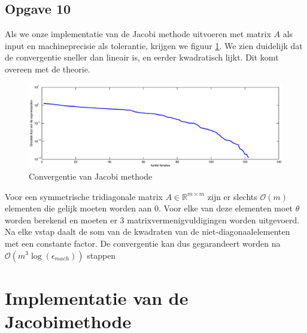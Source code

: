 \documentclass[a4paper, 12pt, titlepage]{report}
\begin{document}
\subsection{Opgave 10}
Als we onze implementatie van de Jacobi methode uitvoeren met matrix $A$ als input en machineprecisie als tolerantie, krijgen we figuur \ref{jacobigraph}. We zien duidelijk dat de convergentie sneller dan lineair is, en eerder kwadratisch lijkt. Dit komt overeen met de theorie. \\
\begin{figure}[htb]
	\begin{center}
	 \includegraphics[width=\textwidth]{jacobi.eps}
	\caption{Convergentie van Jacobi methode}
	\label{jacobigraph}
	\end{center}
\end{figure}

Voor een symmetrische tridiagonale matrix $A \in \mathbb{R}^{m\times m}$ zijn er slechts $\mathcal{O}(m)$ elementen die gelijk moeten worden aan 0. Voor elke van deze elementen moet $\theta$ worden berekend en moeten er 3 matrixvermenigvuldigingen worden uitgevoerd. Na elke vstap daalt de som van de kwadraten van de niet-diagonaalelementen met een constante factor. De convergentie kan dus gegarandeert worden na $\mathcal{O}(m^3\log(\epsilon_{mach}))$ stappen
\section{Implementatie van de Jacobimethode}

\end{document}
